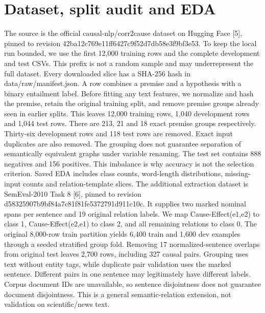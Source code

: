 \documentclass[conference]{IEEEtran}
\begin{document}
\section{Dataset, split audit and EDA}
The source is the official causal-nlp/corr2cause dataset on Hugging Face [5], pinned to revision 42ba12c769e11ff6427c9f52d7db58e3f9bf3e53. To keep the local run bounded, we use the first 12,000 training rows and the complete development and test CSVs. This prefix is not a random sample and may underrepresent the full dataset. Every downloaded slice has a SHA-256 hash in data/raw/manifest.json. A row combines a premise and a hypothesis with a binary entailment label. Before fitting any text features, we normalize and hash the premise, retain the original training split, and remove premise groups already seen in earlier splits. This leaves 12,000 training rows, 1,040 development rows and 1,044 test rows. There are 213, 21 and 18 exact premise groups respectively. Thirty-six development rows and 118 test rows are removed. Exact input duplicates are also removed. The grouping does not guarantee separation of semantically equivalent graphs under variable renaming. The test set contains 888 negatives and 156 positives. This imbalance is why accuracy is not the selection criterion. Saved EDA includes class counts, word-length distributions, missing-input counts and relation-template slices. The additional extraction dataset is SemEval-2010 Task 8 [6], pinned to revision d58325907b9bf84a7c81f81fe5372791d911c10c. It supplies two marked nominal spans per sentence and 19 original relation labels. We map Cause-Effect(e1,e2) to class 1, Cause-Effect(e2,e1) to class 2, and all remaining relations to class 0. The original 8,000-row train partition yields 6,400 train and 1,600 dev examples through a seeded stratified group fold. Removing 17 normalized-sentence overlaps from original test leaves 2,700 rows, including 327 causal pairs. Grouping uses text without entity tags, while duplicate pair validation uses the marked sentence. Different pairs in one sentence may legitimately have different labels. Corpus document IDs are unavailable, so sentence disjointness does not guarantee document disjointness. This is a general semantic-relation extension, not validation on scientific/news text.
\end{document}

